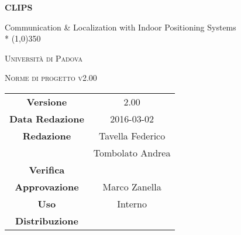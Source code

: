\documentclass[a4paper,12pt]{article}
\author{Conti Oscar Elia, Zanella Marco}
\date{18/02/2016}
\begin{document}
\begin{titlepage}
	\centering
	{\huge\bfseries CLIPS\par}
	Communication \& Localization with Indoor Positioning Systems \\*
	\line(1,0){350} \\
	{\scshape\LARGE Università di Padova \par}
	\vspace{1cm}
	{\scshape\Large Norme di progetto v2.00 \par}
	\logo
	\newpage
		\begin{tabular}{c|c}
			{\hfill \textbf{Versione}} 			& 2.00					    \\
			{\hfill\textbf{Data Redazione}} 	& 2016-03-02		 	    \\ 
			{\hfill\textbf{Redazione}} 			&  Tavella Federico			\\ 
												&  Tombolato Andrea			\\
			{\hfill\textbf{Verifica}} 			&  		\\
			{\hfill\textbf{Approvazione}} 		&  Marco Zanella		\\
			{\hfill\textbf{Uso}} 				&  Interno					\\
			{\hfill\textbf{Distribuzione}} 		&  \leaf					\\
		\end{tabular}
	\end{titlepage}
	\newpage
	\pagestyle{myfront}
	
		\newpage
			\tableofcontents
		\newpage
			\listoffigures	
	\label{LastFrontPage}
	\newpage
	\pagestyle{mymain}
         
    \newpage
		

	\newpage
		
	
	\newpage
		
	
	\newpage
		
		
	\label{LastPage}
\end{document}
